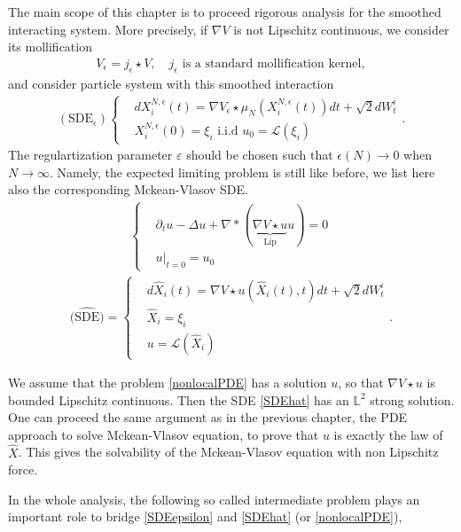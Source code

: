 	 
The main scope of this chapter is to proceed rigorous analysis for the smoothed interacting system.
\vskip3mm
More precisely, if $\nabla V$ is not Lipschitz continuous, we consider its mollification
\begin{align*}
  V_\epsilon = j_{\epsilon}\star V, \quad j_\epsilon\mbox{ is a standard mollification kernel},
\end{align*}
and consider particle system with this smoothed interaction 
 \begin{align} \label{SDEepsilon}
  (\text{SDE}_\epsilon)\begin{cases}
 &dX_i^{N,\epsilon}(t) = \nabla V_\epsilon \star  \mu_N(X_i^{N,\epsilon}(t) ) dt + \sqrt{2}dW_t^i\\
 &X_i^{N,\epsilon}(0) = \xi_i \text{ i.i.d } u_{0}=\mathcal{L}(\xi_i)
 \end{cases}
.\end{align}
The regulartization parameter $\varepsilon$ should be chosen such that $\epsilon(N)\rightarrow 0$ when $N\rightarrow \infty$. Namely, the expected limiting problem is still like before, we list here also the corresponding Mckean-Vlasov SDE.
\begin{align}\label{nonlocalPDE}
\begin{cases}
&\partial_t u - \Delta  u+ \nabla* (\underbrace{\nabla V \star  u}_{\text{Lip}} u) = 0 \\
&u \rvert_{t=0} = u_{0}
\end{cases}
\end{align}
\begin{align}\label{SDEhat}
\widehat{\text{(SDE)}}=\begin{cases}
&d \hat{X}_i (t)= \nabla V \star  u(\hat{X}_i(t),t )  dt + \sqrt{2}dW_t^i\\
&\hat{X}_i = \xi_i \\
&u = \mathcal{L}(\hat{X}_i )
\end{cases} 
.\end{align}

We assume that the problem \autoref{nonlocalPDE} has a solution $u$, so that $\nabla V\star u$ is bounded Lipschitz continuous. Then the SDE \autoref{SDEhat} has an $\mathbb{L}^2$ strong solution. One can proceed the same argument as in the previous chapter, the PDE approach to solve Mckean-Vlasov equation, to prove that $u$ is exactly the law of $\hat{X}$. This gives the solvability of the Mckean-Vlasov equation with non Lipschitz force. 

In the whole analysis, the following so called intermediate problem plays an important role to bridge \autoref{SDEepsilon} and \autoref{SDEhat} (or \autoref{nonlocalPDE}),

